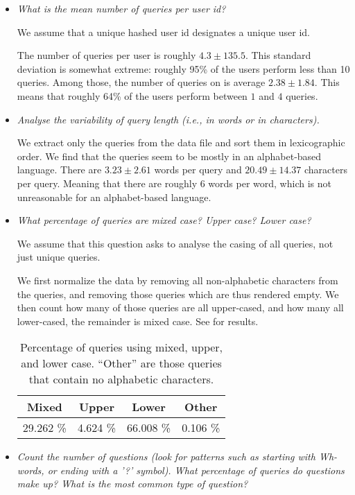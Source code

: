 \begin{itemize}

\item \emph{What is the mean number of queries per user id?}

We assume that a unique hashed user id designates a unique user id.

The number of queries per user is roughly $4.3\pm135.5$. This standard
deviation is somewhat extreme: roughly 95\% of the users perform less than 10
queries. Among those, the number of queries on is average $2.38 \pm 1.84$. This
means that roughly 64\% of the users perform between $1$ and $4$ queries.

\item \emph{Analyse the variability of query length (i.e., in words or in
characters).}

We extract only the queries from the data file and sort them in lexicographic
order. We find that the queries seem to be mostly in an alphabet-based
language. There are $3.23 \pm 2.61$ words per query and $20.49 \pm 14.37$
characters per query. Meaning that there are roughly 6 words per word, which is
not unreasonable for an alphabet-based language.

\item \emph{What percentage of queries are mixed case? Upper case? Lower case?}

We assume that this question asks to analyse the casing of all queries, not
just unique queries.

We first normalize the data by removing all non-alphabetic characters from the
queries, and removing those queries which are thus rendered empty. We then
count how many of those queries are all upper-cased, and how many all
lower-cased, the remainder is mixed case. See  for
results.

\begin{table}[h!]
\centering
\begin{tabular}{|c|c|c|c|}
\hline
\textbf{Mixed} & \textbf{Upper} & \textbf{Lower} & \textbf{Other} \\
\hline
29.262 \%      & 4.624 \%       & 66.008 \%      & 0.106 \% \\
\hline
\end{tabular}
\caption[]{Percentage of queries using mixed, upper, and lower case. ``Other''
are those queries that contain no alphabetic characters.}
\label{table:casing}
\end{table}

\item \emph{Count the number of questions (look for patterns such as starting
with Wh-words, or ending with a '?'    symbol). What percentage of queries do
questions make up? What is the most common type of question?}


\end{itemize}
